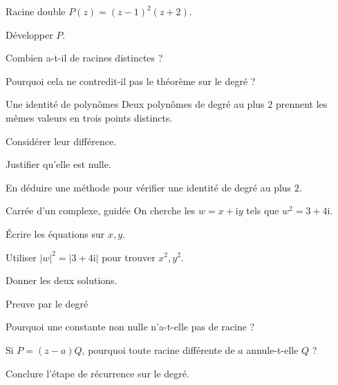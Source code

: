 \begingroup\renewcommand{\otBesoinPlace}[1]{}\begin{minipage}{\linewidth}
\begin{exercice}[3]{Racine double}
$P(z)=(z-1)^2(z+2)$.
\begin{questions}
\item Développer $P$.
\item Combien a-t-il de racines distinctes ?
\item Pourquoi cela ne contredit-il pas le théorème sur le degré ?
\end{questions}
\end{exercice}
\begin{exercice}[3]{Une identité de polynômes}
Deux polynômes de degré au plus $2$ prennent les mêmes valeurs en trois points distincts.
\begin{questions}
\item Considérer leur différence.
\item Justifier qu’elle est nulle.
\item En déduire une méthode pour vérifier une identité de degré au plus $2$.
\end{questions}
\end{exercice}
\begin{exercice}[3]{Carrée d’un complexe, guidée}
On cherche les $w=x+\mathrm iy$ tels que $w^2=3+4\mathrm i$.
\begin{questions}
\item Écrire les équations sur $x,y$.
\item Utiliser $|w|^2=|3+4\mathrm i|$ pour trouver $x^2,y^2$.
\item Donner les deux solutions.
\end{questions}
\end{exercice}
\begin{exercice}[3]{Preuve par le degré}

\begin{questions}
\item Pourquoi une constante non nulle n’a-t-elle pas de racine ?
\item Si $P=(z-a)Q$, pourquoi toute racine différente de $a$ annule-t-elle $Q$ ?
\item Conclure l’étape de récurrence sur le degré.
\end{questions}
\end{exercice}
\end{minipage}\endgroup
